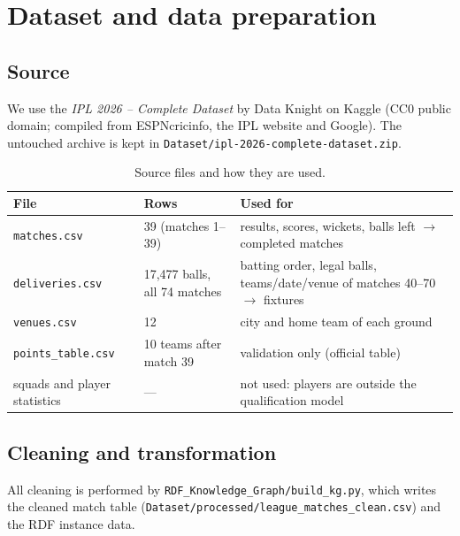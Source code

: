 \section{Dataset and data preparation}

\subsection{Source}
We use the \emph{IPL 2026 -- Complete Dataset} by Data Knight on Kaggle \citep{kaggleipl2026} (CC0 public
domain; compiled from ESPNcricinfo, the IPL website and Google). The untouched archive is kept in
\texttt{Dataset/ipl-2026-complete-dataset.zip}.

\begin{table}[H]\centering\small
\begin{tabular}{p{4.2cm}p{3.6cm}p{7.2cm}}
\toprule
\textbf{File} & \textbf{Rows} & \textbf{Used for} \\ \midrule
\texttt{matches.csv} & 39 (matches 1--39) & results, scores, wickets, balls left $\rightarrow$ completed matches \\
\texttt{deliveries.csv} & 17{,}477 balls, all 74 matches & batting order, legal balls, teams/date/venue of matches 40--70 $\rightarrow$ fixtures \\
\texttt{venues.csv} & 12 & city and home team of each ground \\
\texttt{points\_table.csv} & 10 teams after match 39 & validation only (official table) \\
squads and player statistics & --- & not used: players are outside the qualification model \\
\bottomrule
\end{tabular}
\caption{Source files and how they are used.}
\end{table}

\subsection{Cleaning and transformation}
All cleaning is performed by \texttt{RDF\_Knowledge\_Graph/build\_kg.py}, which writes the cleaned match table
(\texttt{Dataset/processed/league\_matches\_clean.csv}) and the RDF instance data.

